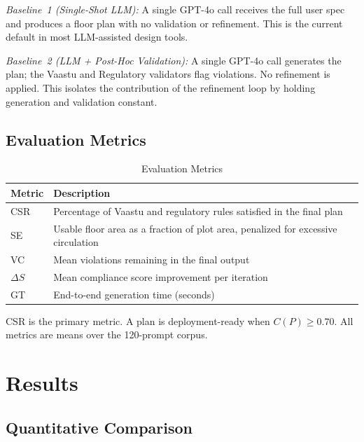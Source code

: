 \documentclass[journal]{IEEEtran}
\begin{document}
\textit{Baseline~1 (Single-Shot LLM):} A single GPT-4o call receives the
full user spec and produces a floor plan with no validation or refinement.
This is the current default in most LLM-assisted design tools.

\textit{Baseline~2 (LLM + Post-Hoc Validation):} A single GPT-4o call
generates the plan; the Vaastu and Regulatory validators flag violations.
No refinement is applied. This isolates the contribution of the refinement
loop by holding generation and validation constant.

\subsection{Evaluation Metrics}
\label{sec:metrics}

\begin{table}[t]
\centering
\caption{Evaluation Metrics}
\label{tab:metrics}
\small
\setlength{\tabcolsep}{4pt}
\renewcommand{\arraystretch}{1.15}
\begin{tabular}{lp{5.8cm}}
\toprule
\textbf{Metric} & \textbf{Description} \\
\midrule
CSR      & Percentage of Vaastu and regulatory rules satisfied
           in the final plan \\
SE       & Usable floor area as a fraction of plot area,
           penalized for excessive circulation \\
VC       & Mean violations remaining in the final output \\
$\Delta S$ & Mean compliance score improvement per iteration \\
GT       & End-to-end generation time (seconds) \\
\bottomrule
\end{tabular}
\end{table}

CSR is the primary metric. A plan is deployment-ready when $C(P) \geq 0.70$.
All metrics are means over the 120-prompt corpus.

\section{Results}

\subsection{Quantitative Comparison}
\end{document}
